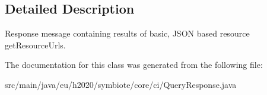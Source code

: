 \subsection{Detailed Description}
Response message containing results of basic, J\+S\+ON based resource get\+Resource\+Urls. 

The documentation for this class was generated from the following file\+:\begin{DoxyCompactItemize}
\item 
src/main/java/eu/h2020/symbiote/core/ci/Query\+Response.\+java\end{DoxyCompactItemize}
